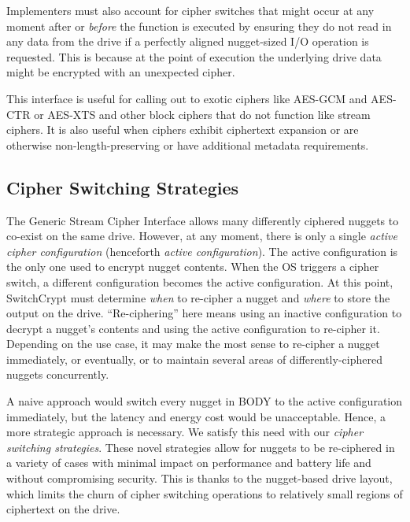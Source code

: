 \begin{enumerate}
   Implementers must also account for cipher switches that might occur
   at any moment after or \emph{before} the function is executed by
   ensuring they do not read in any data from the drive if a perfectly
   aligned nugget-sized I/O operation is requested. This is because at
   the point of execution the underlying drive data might be encrypted
   with an unexpected cipher. 

   This interface is useful for calling out to exotic ciphers like AES-GCM and
   AES-CTR or AES-XTS and other block ciphers that do not function like stream
   ciphers. It is also useful when ciphers exhibit ciphertext expansion or are
   otherwise non-length-preserving or have additional metadata requirements.
\end{enumerate}

\subsection{Cipher Switching Strategies} \label{subsec:strategies}

The Generic Stream Cipher Interface allows many differently ciphered nuggets to
co-exist on the same drive. However, at any moment, there is only a single
\emph{active cipher configuration} (henceforth \emph{active configuration}). The
active configuration is the only one used to encrypt nugget contents. When the
OS triggers a cipher switch, a different configuration becomes the active
configuration. At this point, SwitchCrypt must determine \emph{when} to
re-cipher a nugget and \emph{where} to store the output on the drive.
``Re-ciphering'' here means using an inactive configuration to decrypt a
nugget's contents and using the active configuration to re-cipher it. Depending
on the use case, it may make the most sense to re-cipher a nugget immediately,
or eventually, or to maintain several areas of differently-ciphered nuggets
concurrently.

A naive approach would switch every nugget in BODY to the active configuration
immediately, but the latency and energy cost would be unacceptable. Hence, a
more strategic approach is necessary. We satisfy this need with our \emph{cipher
switching strategies}. These novel strategies allow for nuggets to be
re-ciphered in a variety of cases with minimal impact on performance and battery
life and without compromising security. This is thanks to the nugget-based drive
layout, which limits the churn of cipher switching operations to relatively
small regions of ciphertext on the drive.

